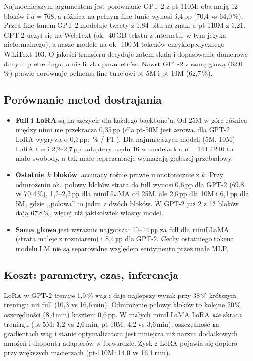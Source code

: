 \documentclass[11pt,a4paper]{article}
\begin{document}
Najmocniejszym argumentem jest porównanie GPT-2 z pt-110M: oba mają 12 bloków i $d=768$, a różnica
na pełnym fine-tunie wynosi 6,4\,pp (70,4 vs 64,0\,\%). Przed fine-tunem GPT-2 modeluje tweety
z 1,84 bitu na znak, a pt-110M z 3,21. GPT-2 uczył się na WebText (ok.\ 40\,GB tekstu z internetu,
w tym języka nieformalnego), a nasze modele na ok.\ 100\,M tokenów encyklopedycznego WikiText-103.
O jakości transferu decyduje zatem skala i dopasowanie domenowe danych pretreningu, a nie liczba
parametrów. Nawet GPT-2 z samą głową (62,0\,\%) prawie dorównuje pełnemu fine-tune'owi pt-5M
i pt-10M (62,7\,\%).

\subsection{Porównanie metod dostrajania}
\begin{itemize}
  \item \textbf{Full i LoRA} są na szczycie dla każdego backbone'u. Od 25M w górę różnica między nimi
        nie przekracza 0,35\,pp (dla pt-50M jest zerowa, dla GPT-2 LoRA wygrywa o 0,3\,pp:
        \resbestAllAcc\,\% / F1 \resbestAllFone). Dla najmniejszych modeli (5M, 10M) LoRA traci
        2,2--2,7\,pp: adaptery rzędu 16 w modelach o $d=144$ i $240$ to mało swobody, a tak małe
        reprezentacje wymagają głębszej przebudowy.
  \item \textbf{Ostatnie $k$ bloków}: accuracy rośnie prawie monotonicznie z $k$. Przy odmrożeniu
        ok.\ połowy bloków strata do full wynosi 0,6\,pp dla GPT-2 (69,8 vs 70,4\,\%), 1,2--2,2\,pp dla
        miniLLaMA od 25M, ale 2,6\,pp dla 10M i 6,1\,pp dla 5M, gdzie ,,połowa'' to jeden z dwóch
        bloków. W GPT-2 już 2 z 12 bloków dają 67,8\,\%, więcej niż jakikolwiek własny model.
  \item \textbf{Sama głowa} jest wyraźnie najgorsza: 10--14\,pp za full dla miniLLaMA (strata
        maleje z rozmiarem) i 8,4\,pp dla GPT-2. Cechy ostatniego tokena modelu LM nie są
        separowalne względem sentymentu przez małe MLP.
\end{itemize}

\subsection{Koszt: parametry, czas, inferencja}
LoRA w GPT-2 trenuje 1,9\,\% wag i daje najlepszy wynik przy 38\,\% krótszym treningu niż full
(10,3 vs 16,6\,min). Odmrożenie połowy bloków to kolejne 20\,\% oszczędności (8,4\,min) kosztem 0,6\,pp.
W małych miniLLaMA LoRA \emph{nie} skraca treningu (pt-5M: 3,2 vs 2,6\,min, pt-10M: 4,2 vs
3,6\,min): oszczędność na gradientach wag i stanie optymalizatora jest mniejsza niż narzut
dodatkowych mnożeń i dropoutu adapterów w forwardzie. Zysk z LoRA pojawia się dopiero przy
większych macierzach (pt-110M: 14,0 vs 16,1\,min).
\end{document}
